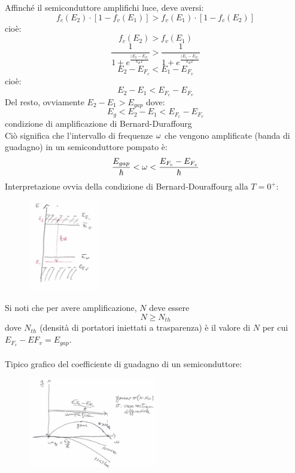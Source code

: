 Affinché il semiconduttore amplifichi luce, deve aversi:
\begin{equation*}
f_c(E_2) \cdot [1 - f_v(E_1)] > f_v(E_1) \cdot [1 - f_c(E_2)]
\end{equation*}
cioè:
\begin{equation*}
f_c(E_2) > f_v(E_1)
\end{equation*}
\begin{equation*}
\frac{1}{1 + e^\frac{(E_2 - E_{F_c}}{k_BT}} > \frac{1}{1 + e^\frac{(E_1 - E_{F_v}}{k_BT}}
\end{equation*}
\begin{equation*}
E_2 - E_{F_c} < E_1 - E_{F_v}
\end{equation*}
cioè:
\begin{equation*}
E_2 - E_1 < E_{F_c} - E_{F_v}
\end{equation*}
Del resto, ovviamente $E_2 - E_1 > E_{gap}$ dove:
\begin{equation*}
E_g < E_2 - E_1 < E_{F_c} - E_{F_v}
\end{equation*}
condizione di amplificazione di Bernard-Duraffourg\\
Ciò significa che l'intervallo di frequenze $\omega$ che vengono amplificate (banda di guadagno) in un semiconduttore pompato è:
\begin{equation*}
\frac{E_{gap}}{\hbar} < \omega < \frac{E_{F_c} - E_{F_v}}{\hbar}
\end{equation*}
Interpretazione ovvia della condizione di Bernard-Douraffourg alla $T=0^+$:
\begin{figure}[H]
\centering
\includegraphics[height=4cm]{images/laser_80_7}
\end{figure}
\noindent
Si noti che per avere amplificazione, $N$ deve essere
\begin{equation*}
N \geq N_{th}
\end{equation*}
dove $N_{th}$ (densità di portatori iniettati a trasparenza) è il valore di $N$ per cui $E_{F_c} - E{F_v} = E_{gap}$.\\
\\
Tipico grafico del coefficiente di guadagno di un semiconduttore:
\begin{figure}[H]
\centering
\includegraphics[height=4cm]{images/laser_80_8}
\end{figure}